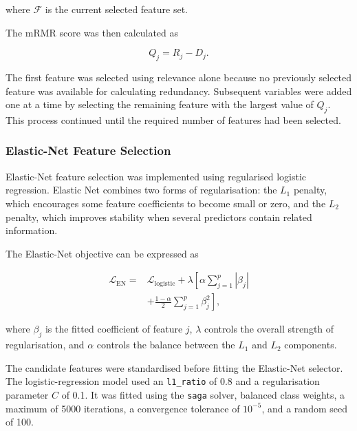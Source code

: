 \documentclass[12pt,twocolumn]{article}
\begin{document}
where \(\mathcal{F}\) is the current selected feature set.

The mRMR score was then calculated as

\begin{equation}
Q_j = R_j-D_j.
\label{eq:mrmr_score}
\end{equation}

The first feature was selected using relevance alone because no
previously selected feature was available for calculating redundancy.
Subsequent variables were added one at a time by selecting the
remaining feature with the largest value of \(Q_j\). This process
continued until the required number of features had been selected.







\subsubsection{Elastic-Net Feature Selection}
\label{subsubsec:elasticnet_selection}

Elastic-Net feature selection was implemented using regularised
logistic regression. Elastic Net combines two forms of regularisation:
the \(L_1\) penalty, which encourages some feature coefficients to
become small or zero, and the \(L_2\) penalty, which improves stability
when several predictors contain related information.

The Elastic-Net objective can be expressed as

\begin{equation}
\begin{aligned}
\mathcal{L}_{\mathrm{EN}}
={}&
\mathcal{L}_{\mathrm{logistic}}
+
\lambda
\left[
\alpha
\sum_{j=1}^{p}
|\beta_j|
\right.\\
&\left.
+
\frac{1-\alpha}{2}
\sum_{j=1}^{p}
\beta_j^2
\right],
\end{aligned}
\label{eq:elasticnet_objective}
\end{equation}

where \(\beta_j\) is the fitted coefficient of feature \(j\),
\(\lambda\) controls the overall strength of regularisation, and
\(\alpha\) controls the balance between the \(L_1\) and \(L_2\)
components.

The candidate features were standardised before fitting the
Elastic-Net selector. The logistic-regression model used an
\texttt{l1\_ratio} of 0.8 and a regularisation parameter \(C\) of
0.1. It was fitted using the \texttt{saga} solver, balanced class
weights, a maximum of 5000 iterations, a convergence tolerance of
\(10^{-5}\), and a random seed of 100.
\end{document}
